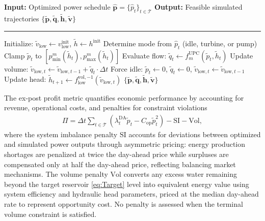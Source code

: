 \documentclass[journal]{IEEEtran}
\begin{document}
\begin{algorithm}[t!]
\caption{Physical Simulation Layer}
\label{alg:simulation}
\begin{algorithmic}[1]
\Statex \textbf{Input:} Optimized power schedule $\hat{\mathbf{p}} = \{\hat{p}_t\}_{t \in \mathcal{T}}$
\Statex \textbf{Output:} Feasible simulated trajectories $\{\tilde{\mathbf{p}}, \tilde{\mathbf{q}}, \tilde{\mathbf{h}}, \tilde{\mathbf{v}}\}$
\vspace{1pt}
\Statex \hrule
\State Initialize: $\tilde{v}_{\text{low}} \gets v_{\text{low}}^{\text{init}}$, $\tilde{h} \gets h^{\text{init}}$
    \State Determine mode from $\hat{p}_t$ (idle, turbine, or pump)
    \State Clamp $\tilde{p}_t$ to $[p_{\min}^m(\tilde{h}_t), p_{\max}^m(\tilde{h}_t)]$
    \State Evaluate flow: $\tilde{q}_t \gets f_m^{\text{UPC}}(\tilde{p}_t, \tilde{h}_t)$
    \State Update volume: $\tilde{v}_{\text{low},t} \gets \tilde{v}_{\text{low},t-1} + \tilde{q}_t \cdot \Delta t$
        \State Force idle: $\tilde{p}_t \gets 0$, $\tilde{q}_t \gets 0$, $\tilde{v}_{\text{low},t} \gets \tilde{v}_{\text{low},t-1}$
    \EndIf
    \State Update head: $\tilde{h}_{t+1} \gets f_{\text{low}}^{\text{vol},-1}(\tilde{v}_{\text{low},t})$
\EndFor
\State \Return $\{\tilde{\mathbf{p}}, \tilde{\mathbf{q}}, \tilde{\mathbf{h}}, \tilde{\mathbf{v}}\}$
\end{algorithmic}
\end{algorithm}

The ex-post profit metric quantifies economic performance by accounting for revenue, operational costs, and penalties for constraint violations
\begin{align}
\Pi= \Delta t \sum_{t \in \mathcal{T}} \left( \lambda_t^{\text{DA}} \tilde{p}_t - C_{\text{op}} \tilde{p}_t^2 \right) - \text{SI} - \text{Vol},
\label{eq:expost_profit}
\end{align}
where the system imbalance penalty $\text{SI}$ accounts for deviations between optimized and simulated power outputs through asymmetric pricing: energy production shortages are penalized at twice the day-ahead price while surpluses are compensated only at half the day-ahead price, reflecting balancing market mechanisms. The volume penalty $\text{Vol}$ converts any excess water remaining beyond the target reservoir \eqref{eq:Target} level into equivalent energy value using system efficiency and hydraulic head parameters, priced at the median day-ahead rate to represent opportunity cost. No penalty is assessed when the terminal volume constraint is satisfied.
\end{document}
